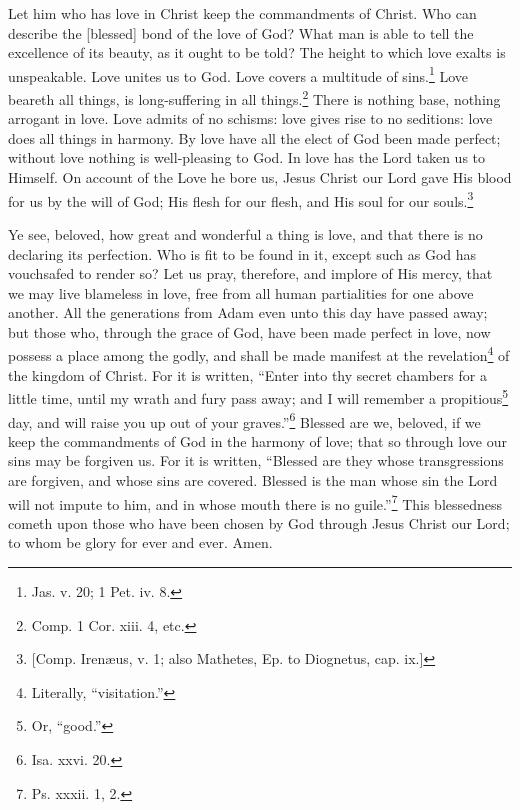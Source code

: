 
Let him who has love in Christ keep the commandments of Christ. Who can describe the [blessed] bond of the love of God? What man is able to tell the excellence of its beauty, as it ought to be told? The height to which love exalts is unspeakable. Love unites us to God. Love covers a multitude of sins.\footnote{Jas. v. 20; 1 Pet. iv. 8.} Love beareth all things, is long-suffering in all things.\footnote{Comp. 1 Cor. xiii. 4, etc.} There is nothing base, nothing arrogant in love. Love admits of no schisms: love gives rise to no seditions: love does all things in harmony. By love have all the elect of God been made perfect; without love nothing is well-pleasing to God. In love has the Lord taken us to Himself. On account of the Love he bore us, Jesus Christ our Lord gave His blood for us by the will of God; His flesh for our flesh, and His soul for our souls.\footnote{[Comp. Irenæus, v. 1; also Mathetes, Ep. to Diognetus, cap. ix.]}


Ye see, beloved, how great and wonderful a thing is love, and that there is no declaring its perfection. Who is fit to be found in it, except such as God has vouchsafed to render so? Let us pray, therefore, and implore of His mercy, that we may live blameless in love, free from all human partialities for one above another. All the generations from Adam even unto this day have passed away; but those who, through the grace of God, have been made perfect in love, now possess a place among the godly, and shall be made manifest at the revelation\footnote{Literally, “visitation.”} of the kingdom of Christ. For it is written, “Enter into thy secret chambers for a little time, until my wrath and fury pass away; and I will remember a propitious\footnote{Or, “good.”} day, and will raise you up out of your graves.”\footnote{Isa. xxvi. 20.} Blessed are we, beloved, if we keep the commandments of God in the harmony of love; that so through love our sins may be forgiven us. For it is written, “Blessed are they whose transgressions are forgiven, and whose sins are covered. Blessed is the man whose sin  the Lord will not impute to him, and in whose mouth there is no guile.”\footnote{Ps. xxxii. 1, 2.} This blessedness cometh upon those who have been chosen by God through Jesus Christ our Lord; to whom be glory for ever and ever. Amen.


